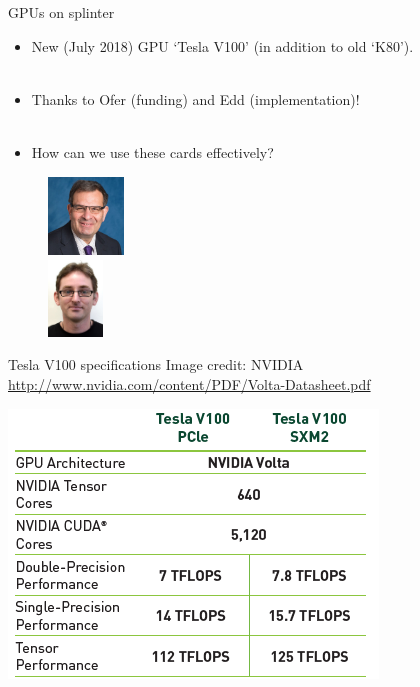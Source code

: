 \documentclass[usenames,dvipsnames]{beamer}
\begin{document}
\begin{frame}{GPUs on splinter}
  \begin{block}{}
    \begin{itemize}
      \item{New (July 2018) GPU `Tesla V100' (in addition to old `K80').}\\~\
      \item{Thanks to Ofer (funding) and Edd (implementation)!}\\~\
      \item{How can we use these cards effectively?}
    \end{itemize}
  \end{block}
    
  
  \begin{figure}
  \begin{multicols}{2}
  \centering
  \includegraphics[width=0.18\textwidth]{Ofer_Lahav_photo_2014_SB_STFC.jpg}\\
  \includegraphics[width=0.13\textwidth]{Edward_Edmonson_2016_w.jpg}\\
  \end{multicols}
  \end{figure}

\end{frame}

\begin{frame}{Tesla V100 specifications} {\tiny Image credit: NVIDIA \url{http://www.nvidia.com/content/PDF/Volta-Datasheet.pdf}}
  \begin{block}{}
    \begin{center}
      \includegraphics[scale=0.90]{V100_specsheet_A.png}
    \end{center}
  \end{block}
\end{frame}
\end{document}
